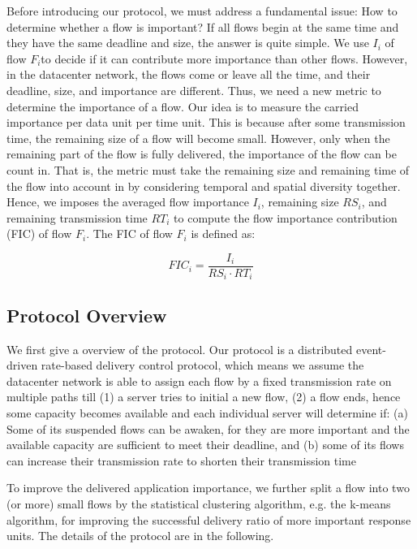 \documentclass[conference]{IEEEtran}
\begin{document}
Before introducing our protocol, we must address a fundamental issue: How to determine whether a flow is important? If all flows begin at the same time and they have the same deadline and size, the answer is quite simple. We use $I_{i}$ of flow $F_{i} $to decide if it can contribute more importance than other flows. However, in the datacenter network, the flows come or leave all the time, and their deadline, size, and importance are different. Thus, we need a new metric to determine the importance of a flow.
Our idea is to measure the carried importance per data unit per time unit. This is because after some transmission time, the remaining size of a flow will become small. However, only when the remaining part of the flow is fully delivered, the importance of the flow can be count in. That is, the metric must take the remaining size and remaining time of the flow into account in by considering temporal and spatial diversity together. Hence, we imposes the averaged flow importance $I_{i}$, remaining size $RS_{i}$, and remaining transmission time $RT_{i}$ to compute the flow importance contribution (FIC) of flow $F_{i}$. The FIC of flow $F_{i}$ is defined as:

\begin{equation}
 FIC_{i}=\frac{I_{i}}{RS_{i} \cdot RT_{i}}
 \label{eq:ficofi}
\end{equation}

\subsection{Protocol Overview}

We first give a overview of the protocol. Our protocol is a distributed event-driven rate-based delivery control protocol, which means we assume the datacenter network is able to assign each flow by a fixed transmission rate on multiple paths till (1) a server tries to initial a new flow, (2) a flow ends, hence some capacity becomes available and each individual server will determine if: (a) Some of its suspended flows can be awaken, for they are more important and the available capacity are sufficient to meet their deadline, and (b) some of its flows can increase their transmission rate to shorten their transmission time



To improve the delivered application importance, we further split a flow into two (or more) small flows by the statistical clustering algorithm, e.g. the k-means algorithm, for improving the successful delivery ratio of more important response units. The details of the protocol are in the following.
\end{document}
